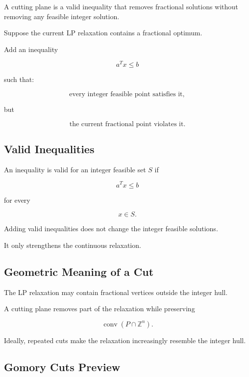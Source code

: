 A cutting plane is a valid inequality that removes fractional solutions
without removing any feasible integer solution.

Suppose the current LP relaxation contains a fractional optimum.

Add an inequality

\[
\boxed{
a^Tx\leq b
}
\]

such that:

\[
\boxed{
\text{every integer feasible point satisfies it},
}
\]

but

\[
\boxed{
\text{the current fractional point violates it}.
}
\]

\subsection{Valid Inequalities}
\label{subsec:valid-inequalities}

An inequality is valid for an integer feasible set \(S\) if

\[
\boxed{
a^Tx\leq b
}
\]

for every

\[
x\in S.
\]

Adding valid inequalities does not change the integer feasible solutions.

It only strengthens the continuous relaxation.

\subsection{Geometric Meaning of a Cut}
\label{subsec:geometric-cutting-plane}

The LP relaxation may contain fractional vertices outside the integer
hull.

A cutting plane removes part of the relaxation while preserving

\[
\boxed{
\operatorname{conv}
(
P\cap\mathbb{Z}^n
).
}
\]

Ideally, repeated cuts make the relaxation increasingly resemble the
integer hull.

\subsection{Gomory Cuts Preview}
\label{subsec:gomory-cuts}


